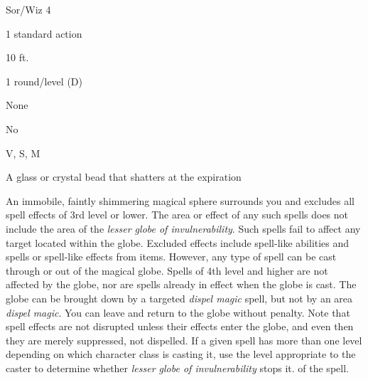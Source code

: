 
\begin{description*}
\item[Level:] Sor/Wiz 4
\item[Casting Time:] 1 standard action
\item[Range:] 10 ft.
\item[Duration:] 1 round/level (D)
\item[Saving Throw:] None
\item[Spell Resistance:] No
\item[Components:] V, S, M
\item[Arcane Material Component:] A glass or crystal bead that shatters at the expiration
\end{description*}

An immobile, faintly shimmering magical sphere surrounds you and excludes all spell
effects of 3rd level or lower. The area or effect of any such spells does not include
the area of the \textit{lesser globe of invulnerability}. Such spells fail to affect
any target located within the globe. Excluded effects include spell-like abilities
and spells or spell-like effects from items. However, any type of spell can be
cast through or out of the magical globe. Spells of 4th level and higher are not
affected by the globe, nor are spells already in effect when the globe is cast.
The globe can be brought down by a targeted \textit{dispel magic} spell, but not
by an area \textit{dispel magic}. You can leave and return to the globe without
penalty.
Note that spell effects are not disrupted unless their effects enter the globe,
and even then they are merely suppressed, not dispelled.
If a given spell has more than one level depending on which character class is
casting it, use the level appropriate to the caster to determine whether \textit{lesser
globe of invulnerability} stops it.
of the spell.